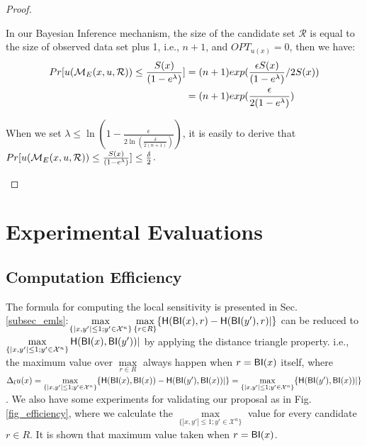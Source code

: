 \begin{proof}
\begin{itemize}
In our Bayesian Inference mechanism, the size of the candidate set $\mathcal{R}$ is equal to the size of observed data set plus 1, i.e., $n + 1$, and $OPT_{u(x)} = 0$, then we have:
\begin{equation*}
\begin{split}
Pr[u(\mathcal{M}_E(x, u, \mathcal{R})) \leq \frac{S(x)}{(1 - e ^ {\lambda})}] 
& = (n + 1)exp(\frac{\epsilon S(x)}{(1 - e ^ {\lambda})}/2 S(x))\\
& = (n + 1)exp(\frac{\epsilon}{2 (1 - e ^ {\lambda})})\\
\end{split}
\end{equation*}

When we set $\lambda \leq \ln(1 - \frac{\epsilon}{2 \ln (\frac{\delta}{2 (n + 1)})})$, it is easily to derive that $Pr[u(\mathcal{M}_E(x, u, \mathcal{R})) \leq \frac{S(x)}{(1 - e ^ {\lambda})}] \leq \frac{\delta}{2}$.

\end{itemize}

\end{proof}

\section{Experimental Evaluations}
\subsection{Computation Efficiency}
The formula for computing the local sensitivity is presented in Sec. \ref{subsec_emls}:$\max\limits_{\{|x,y'| \leq 1; y'\in \mathcal{X}^n\}}\max\limits_{\{r\in R\}} \{\mathsf{H}(\mathsf{BI}(x), r) - \mathsf{H}(\mathsf{BI}(y'), r)|\}$ can be reduced to $\max\limits_{\{|x,y'| \leq 1;y'\in \mathcal{X}^n\}}\mathsf{H}(\mathsf{BI}(x), \mathsf{BI}(y'))|$ by applying the distance triangle property. i.e., the maximum value over $\max\limits_{r \in R}$ always happen when $r = \mathsf{BI}(x)$ itself, where $\Delta_{l}u(x) = \max\limits_{\{|x,y'| \leq 1;y'\in \mathcal{X}^n\}} \{\mathsf{H}(\mathsf{BI}(x), \mathsf{BI}(x)) - \mathsf{H}(\mathsf{BI}(y'), \mathsf{BI}(x))|\} = \max\limits_{\{|x,y'| \leq 1;y'\in \mathcal{X}^n\}} \{\mathsf{H}(\mathsf{BI}(y'), \mathsf{BI}(x))|\}$. We also have some experiments for validating our proposal as in Fig. \ref{fig_efficiency}, where we calculate the $\max\limits_{\{|x,y'| \leq 1;y'\in \mathcal{X}^n\}}$ value for every candidate $r \in R$. It is shown that maximum value taken when  $r = \mathsf{BI}(x)$.

